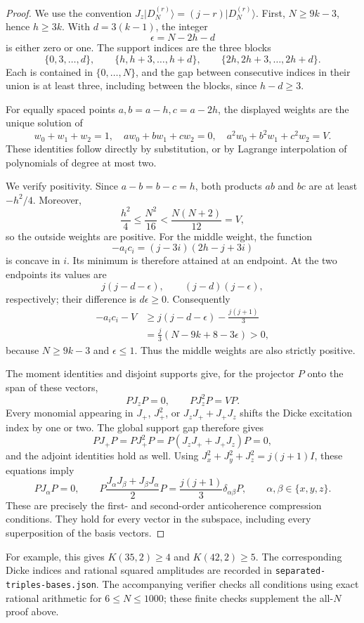 \documentclass[11pt]{article}
\newcommand{\ket}[1]{\lvert #1\rangle}
\begin{document}
\begin{proof}
We use the convention $J_z\ket{D_N^{(r)}}=(j-r)\ket{D_N^{(r)}}$.
First, $N\ge9k-3$, hence $h\ge3k$.  With $d=3(k-1)$, the integer
\[
 \epsilon=N-2h-d
\]
is either zero or one.  The support indices are the three blocks
\[
 \{0,3,\ldots,d\},\qquad
 \{h,h+3,\ldots,h+d\},\qquad
 \{2h,2h+3,\ldots,2h+d\}.
\]
Each is contained in $\{0,\ldots,N\}$, and the gap between consecutive
indices in their union is at least three, including between the blocks,
since $h-d\ge3$.

For equally spaced points $a,b=a-h,c=a-2h$, the displayed weights are the
unique solution of
\[
 w_0+w_1+w_2=1,\quad aw_0+bw_1+cw_2=0,\quad
 a^2w_0+b^2w_1+c^2w_2=V.
\]
These identities follow directly by substitution, or by Lagrange interpolation
of polynomials of degree at most two.

We verify positivity.  Since $a-b=b-c=h$, both products $ab$ and $bc$ are
at least $-h^2/4$.  Moreover,
\[
 \frac{h^2}{4}\le\frac{N^2}{16}<\frac{N(N+2)}{12}=V,
\]
so the outside weights are positive.  For the middle weight, the function
\[
 -a_ic_i=(j-3i)(2h-j+3i)
\]
is concave in $i$.  Its minimum is therefore attained at an endpoint.
At the two endpoints its values are
\[
 j(j-d-\epsilon),\qquad (j-d)(j-\epsilon),
\]
respectively; their difference is $d\epsilon\ge0$.  Consequently
\begin{align*}
 -a_ic_i-V
 &\ge j(j-d-\epsilon)-\frac{j(j+1)}3\\
 &=\frac j3\left(N-9k+8-3\epsilon\right)>0,
\end{align*}
because $N\ge9k-3$ and $\epsilon\le1$.  Thus the middle weights are also
strictly positive.

The moment identities and disjoint supports give, for the projector $P$ onto
the span of these vectors,
\[
 PJ_zP=0,\qquad PJ_z^2P=VP.
\]
Every monomial appearing in $J_+$, $J_+^2$, or
$J_zJ_++J_+J_z$ shifts the Dicke excitation index by one or two.  The global
support gap therefore gives
\[
 PJ_+P=PJ_+^2P=P(J_zJ_++J_+J_z)P=0,
\]
and the adjoint identities hold as well.  Using
$J_x^2+J_y^2+J_z^2=j(j+1)I$, these equations imply
\[
 PJ_\alpha P=0,\qquad
 P\frac{J_\alpha J_\beta+J_\beta J_\alpha}{2}P
 =\frac{j(j+1)}3\delta_{\alpha\beta}P,
 \qquad \alpha,\beta\in\{x,y,z\}.
\]
These are precisely the first- and second-order anticoherence compression
conditions.  They hold for every vector in the subspace, including every
superposition of the basis vectors.
\end{proof}

For example, this gives $K(35,2)\ge4$ and $K(42,2)\ge5$.
The corresponding Dicke indices and rational squared amplitudes are recorded
in \texttt{separated-triples-bases.json}.  The accompanying verifier checks all
conditions using exact rational arithmetic for $6\le N\le1000$; these finite
checks supplement the all-$N$ proof above.
\end{document}
